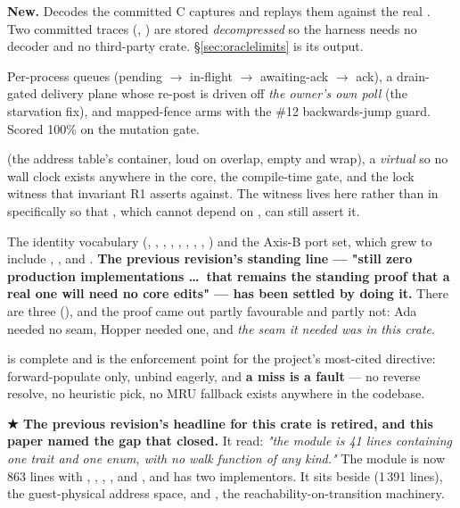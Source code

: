 \documentclass[10.5pt]{article}
\begin{document}
\textbf{New.} Decodes the committed C captures and replays them against the real
. Two committed traces (, ) are stored \emph{decompressed} so
the harness needs no decoder and no third-party crate. \S\ref{sec:oraclelimits} is its output.

Per-process queues (pending $\to$ in-flight $\to$ awaiting-ack $\to$ ack), a drain-gated
delivery plane whose re-post is driven off \emph{the owner's own poll} (the starvation fix), and
mapped-fence arms with the \#12 backwards-jump guard. Scored 100\% on the mutation gate.

 (the address table's container, loud on overlap, empty and wrap), a
\emph{virtual}  so no wall clock exists anywhere in the core, the
 compile-time gate, and the lock witness that invariant R1 asserts
against. The witness lives here rather than in  specifically so that
, which cannot depend on , can still assert it.

The identity vocabulary (, , , ,
, , , , ) and the Axis-B port
set, which grew to include , ,  and
. \textbf{The previous revision's standing line — "still zero production
implementations \dots\ that remains the standing proof that a real one will need no core edits" —
has been settled by doing it.} There are three (), and the proof came out
partly favourable and partly not: Ada needed no seam, Hopper needed one, and \emph{the seam it
needed was in this crate}.

 is complete and is the enforcement point for the project's most-cited
directive: forward-populate only, unbind eagerly, and \textbf{a miss is a fault} — no reverse
resolve, no heuristic pick, no MRU fallback exists anywhere in the codebase.

\textbf{★ The previous revision's headline for this crate is retired, and this paper named the
gap that closed.} It read: \emph{"the  module is 41 lines containing one trait and
one enum, with no walk function of any kind."} The module is now 863 lines with ,
, , ,
 and , and  has two implementors. It sits
beside  (1\,391 lines), the guest-physical address space, and , the
reachability-on-transition machinery.
\end{document}
